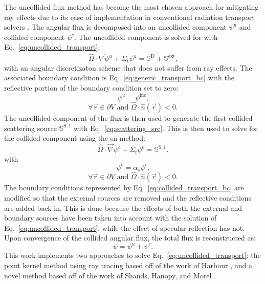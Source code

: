 The uncollided flux method has become the most chosen approach for mitigating ray effects due to its ease of implementation in conventional radiation transport solvers \cite{fem_arbitrary_uncollided}. The angular flux is decomposed into an uncollided component $\psi^{u}$ and collided component $\psi^{c}$. The uncollided component is solved for with Eq.~\ref{eq:uncollided_transport}:
\begin{equation}\label{eq:uncollided_transport}
    \hat{\Omega}\cdot\vec{\nabla}\psi^{u}
    + \Sigma_{t}\psi^{u}
    = \mathbb{S}^{\text{D}}
    + \mathbb{S}^{\text{ext}}\text{,}
\end{equation}
with an angular discretizaton scheme that does not suffer from ray effects. The associated boundary condition is Eq.~\ref{eq:generic_transport_bc} with the reflective portion of the boundary condition set to zero:
\begin{equation}\label{eq:uncollided_transport_bc}
    \psi^{u} = \psi^{\text{inc}}\text{,}
\end{equation}
\begin{equation*}
    \forall \vec{r}\in\partial V \text{ and } \hat{\Omega}\cdot\hat{n}(\vec{r}) < 0\text{.}
\end{equation*}
The uncollided component of the flux is then used to generate the first-collided scattering source $\mathbb{S}^{\text{S}, 1}$ with Eq.~\ref{eq:scattering_src}. This is then used to solve for the collided component using the \acrshort{sn} method:
\begin{equation}\label{eq:collided_transport}
    \hat{\Omega}\cdot\vec{\nabla}\psi^{c}
    + \Sigma_{t}\psi^{c}
    = \mathbb{S}^{\text{S}, 1}\text{.}
\end{equation}
with
\begin{equation}\label{eq:collided_transport_bc}
    \psi^{c} = \alpha_{s}\psi^{c}\text{,}
\end{equation}
\begin{equation*}
    \forall \vec{r}\in\partial V \text{ and } \hat{\Omega}\cdot\hat{n}(\vec{r}) < 0\text{.}
\end{equation*}
The boundary conditions represented by Eq.~\ref{eq:collided_transport_bc} are modified so that the external sources are removed and the reflective conditions are added back in. This is done because the effects of both the external and boundary sources have been taken into account with the solution of Eq.~\ref{eq:uncollided_transport}, while the effect of specular reflection has not. Upon convergence of the collided angular flux, the total flux is reconstructed as:
\begin{equation}\label{eq:mitigated_total_flux}
    \psi = \psi^{u} + \psi^{c}\text{.}
\end{equation}
This work implements two approaches to solve Eq.~\ref{eq:uncollided_transport}: the point kernel method using ray tracing based off of the work of Harbour \cite{harbour_uncollided}, and a novel method based off of the work of Shands, Hanopy, and Morel \cite{modified_sn}.

